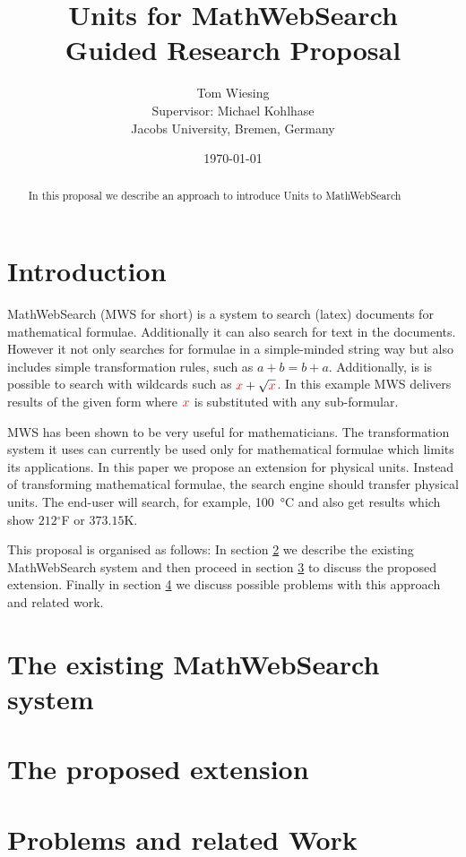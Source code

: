 \documentclass[11pt]{article}
\title{Units for MathWebSearch\ednote{Preliminary Title}\\ \vspace{2 mm} Guided Research Proposal}
\author{Tom Wiesing\\Supervisor: Michael Kohlhase\\Jacobs University, Bremen, Germany}
\date{\today}
\begin{document}
\maketitle

\begin{abstract}
  In this proposal we describe an approach to introduce Units to MathWebSearch
\end{abstract}

\section{Introduction}


MathWebSearch (MWS for short) is a system to search (latex) documents for mathematical formulae. Additionally it can also search for text in the documents. However it not only searches for formulae in a simple-minded string way but also includes simple transformation rules, such as $a + b = b + a$. Additionally, is is possible to search with wildcards such as $ { \color{red} x} + \sqrt{\color{red} x}$. In this example MWS delivers results of the given form where $\color{red} x$ is substituted with any sub-formular.

MWS has been shown to be very useful for mathematicians. The transformation system it uses can currently be used only for mathematical formulae which limits its applications. In this paper we propose an extension for physical units. Instead of transforming mathematical formulae, the search engine should transfer physical units.
The end-user will search, for example, \SI{100}{\degreeCelsius} and also get results which show $212$$^\circ$F or $373.15$K.

This proposal is organised as follows: In section \ref{sec:mws} we describe the existing MathWebSearch system and then proceed in section \ref{sec:extension} to discuss the proposed extension. Finally in section \ref{sec:problems_relatedwork} we discuss possible problems with this approach and related work.

\section{The existing MathWebSearch system}
\label{sec:mws}


\section{The proposed extension}
\label{sec:extension}


\section{Problems and related Work}
\label{sec:problems_relatedwork}


\end{document}
